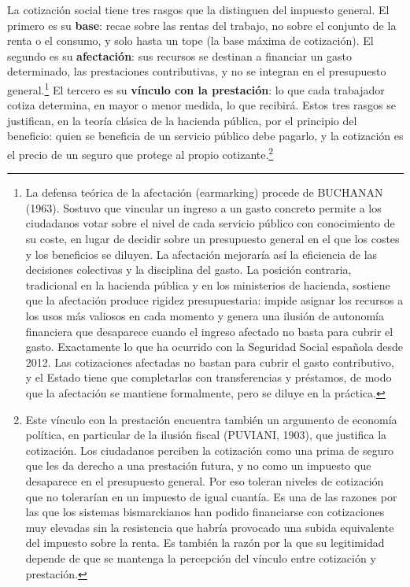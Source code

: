 \documentclass[10pt,a4paper]{article}
\begin{document}
La cotización social tiene tres rasgos que la distinguen del impuesto general. El primero es su \textbf{base}: recae sobre las rentas del trabajo, no sobre el conjunto de la renta o el consumo, y solo hasta un tope (la base máxima de cotización). El segundo es su \textbf{afectación}: sus recursos se destinan a financiar un gasto determinado, las prestaciones contributivas, y no se integran en el presupuesto general.\footnote{%
    La defensa teórica de la afectación (earmarking) procede de BUCHANAN (1963). Sostuvo que vincular un ingreso a un gasto concreto permite a los ciudadanos votar sobre el nivel de cada servicio público con conocimiento de su coste, en lugar de decidir sobre un presupuesto general en el que los costes y los beneficios se diluyen. La afectación mejoraría así la eficiencia de las decisiones colectivas y la disciplina del gasto. La posición contraria, tradicional en la hacienda pública y en los ministerios de hacienda, sostiene que la afectación produce rigidez presupuestaria: impide asignar los recursos a los usos más valiosos en cada momento y genera una ilusión de autonomía financiera que desaparece cuando el ingreso afectado no basta para cubrir el gasto. Exactamente lo que ha ocurrido con la Seguridad Social española desde 2012. Las cotizaciones afectadas no bastan para cubrir el gasto contributivo, y el Estado tiene que completarlas con transferencias y préstamos, de modo que la afectación se mantiene formalmente, pero se diluye en la práctica.
} El tercero es su \textbf{vínculo con la prestación}: lo que cada trabajador cotiza determina, en mayor o menor medida, lo que recibirá. Estos tres rasgos se justifican, en la teoría clásica de la hacienda pública, por el principio del beneficio: quien se beneficia de un servicio público debe pagarlo, y la cotización es el precio de un seguro que protege al propio cotizante.\footnote{%
    Este vínculo con la prestación encuentra también un argumento de economía política, en particular de la ilusión fiscal (PUVIANI, 1903), que justifica la cotización. Los ciudadanos perciben la cotización como una prima de seguro que les da derecho a una prestación futura, y no como un impuesto que desaparece en el presupuesto general. Por eso toleran niveles de cotización que no tolerarían en un impuesto de igual cuantía. Es una de las razones por las que los sistemas bismarckianos han podido financiarse con cotizaciones muy elevadas sin la resistencia que habría provocado una subida equivalente del impuesto sobre la renta. Es también la razón por la que su legitimidad depende de que se mantenga la percepción del vínculo entre cotización y prestación.
}
\end{document}
